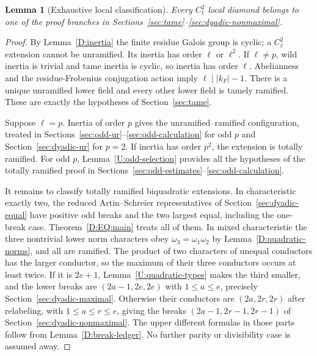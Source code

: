 \documentclass[11pt]{amsart}
\newtheorem{lemma}[theorem]{Lemma}
\theoremstyle{definition}
\theoremstyle{remark}
\begin{document}
\begin{lemma}[Exhaustive local classification]\label{U:dispatch}
Every $C_\ell^2$ local diamond belongs to one of the proof branches in
Sections~\ref{sec:tame}--\ref{sec:dyadic-nonmaximal}.
\end{lemma}
\begin{proof}
By Lemma~\ref{D:inertia} the finite residue Galois group is cyclic;
a $C_\ell^2$ extension cannot be unramified. Its inertia has order $\ell$ or $\ell^2$.
If $\ell\ne p$, wild inertia is trivial and tame inertia is cyclic,
so inertia has order $\ell$. Abelianness and the residue-Frobenius
conjugation action imply $\ell\mid |k_F|-1$. There is a unique unramified
lower field and every other lower field is tamely ramified. These are
exactly the hypotheses of Section~\ref{sec:tame}.

Suppose $\ell=p$. Inertia of order $p$ gives the unramified--ramified
configuration, treated in Sections~\ref{sec:odd-ur}--\ref{sec:odd-calculation} for odd $p$ and Section~\ref{sec:dyadic-ur} for $p=2$.
If inertia has order $p^2$, the extension is totally ramified.
For odd $p$, Lemma~\ref{U:odd-selection} provides all the hypotheses of
the totally ramified proof in Sections~\ref{sec:odd-estimates}--\ref{sec:odd-calculation}.

It remains to classify totally ramified biquadratic extensions.
In characteristic exactly two, the reduced Artin--Schreier representatives
of Section~\ref{sec:dyadic-equal} have positive odd breaks and the two largest equal, including
the one-break case. Theorem~\ref{D:EQ:main} treats all of them.
In mixed characteristic the three nontrivial lower norm characters obey
$\omega_3=\omega_1\omega_2$ by Lemma~\ref{D:quadratic-norms},
and all are ramified. The product of two
characters of unequal conductors has the larger conductor, so the maximum
of their three conductors occurs at least twice. If it is $2e+1$,
Lemma~\ref{U:quadratic-types} makes the third smaller, and the lower breaks
are $(2a-1,2e,2e)$ with $1\le a\le e$, precisely Section~\ref{sec:dyadic-maximal}.
Otherwise their conductors are $(2a,2r,2r)$ after relabeling, with
$1\le a\le r\le e$, giving the breaks $(2a-1,2r-1,2r-1)$ of Section~\ref{sec:dyadic-nonmaximal}.
The upper different formulas in those parts follow from
Lemma~\ref{D:break-ledger}. No further parity or divisibility case is
assumed away.
\end{proof}
\end{document}
